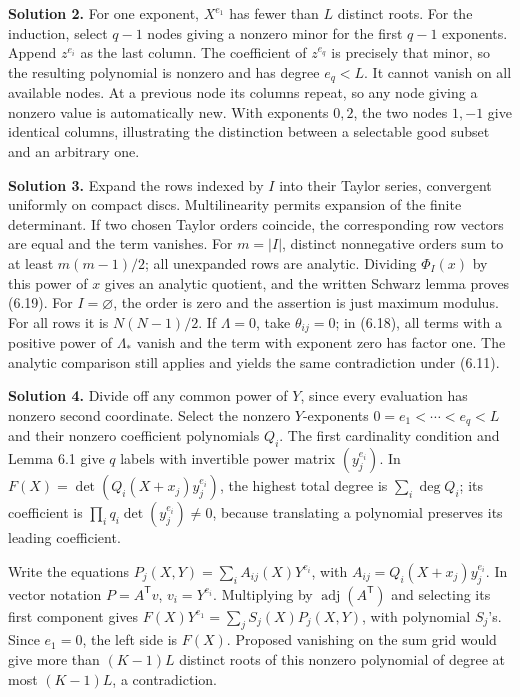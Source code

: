 \documentclass[
  11pt,
  a4paper,
]{article}
\begin{document}
\textbf{Solution 2.} For one exponent, \(X^{e_1}\) has fewer than \(L\)
distinct roots. For the induction, select \(q-1\) nodes giving a nonzero
minor for the first \(q-1\) exponents. Append \(z^{e_i}\) as the last
column. The coefficient of \(z^{e_q}\) is precisely that minor, so the
resulting polynomial is nonzero and has degree \(e_q<L\). It cannot
vanish on all available nodes. At a previous node its columns repeat, so
any node giving a nonzero value is automatically new. With exponents
\(0,2\), the two nodes \(1,-1\) give identical columns, illustrating the
distinction between a selectable good subset and an arbitrary one.

\textbf{Solution 3.} Expand the rows indexed by \(I\) into their Taylor
series, convergent uniformly on compact discs. Multilinearity permits
expansion of the finite determinant. If two chosen Taylor orders
coincide, the corresponding row vectors are equal and the term vanishes.
For \(m=|I|\), distinct nonnegative orders sum to at least \(m(m-1)/2\);
all unexpanded rows are analytic. Dividing \(\Phi_I(x)\) by this power
of \(x\) gives an analytic quotient, and the written Schwarz lemma
proves (6.19). For \(I=\varnothing\), the order is zero and the
assertion is just maximum modulus. For all rows it is \(N(N-1)/2\). If
\(\Lambda=0\), take \(\theta_{ij}=0\); in (6.18), all terms with a
positive power of \(\Lambda_*\) vanish and the term with exponent zero
has factor one. The analytic comparison still applies and yields the
same contradiction under (6.11).

\textbf{Solution 4.} Divide off any common power of \(Y\), since every
evaluation has nonzero second coordinate. Select the nonzero
\(Y\)-exponents \(0=e_1<\cdots<e_q<L\) and their nonzero coefficient
polynomials \(Q_i\). The first cardinality condition and Lemma 6.1 give
\(q\) labels with invertible power matrix \((y_j^{e_i})\). In
\(F(X)=\det(Q_i(X+x_j)y_j^{e_i})\), the highest total degree is
\(\sum_i\deg Q_i\); its coefficient is
\(\prod_iq_i\det(y_j^{e_i})\ne0\), because translating a polynomial
preserves its leading coefficient.

Write the equations \(P_j(X,Y)=\sum_i A_{ij}(X)Y^{e_i}\), with
\(A_{ij}=Q_i(X+x_j)y_j^{e_i}\). In vector notation \(P=A^{\mathsf T}v\),
\(v_i=Y^{e_i}\). Multiplying by \(\operatorname{adj}(A^{\mathsf T})\)
and selecting its first component gives
\(F(X)Y^{e_1}=\sum_j S_j(X)P_j(X,Y)\), with polynomial \(S_j\)'s. Since
\(e_1=0\), the left side is \(F(X)\). Proposed vanishing on the sum grid
would give more than \((K-1)L\) distinct roots of this nonzero
polynomial of degree at most \((K-1)L\), a contradiction.
\end{document}
